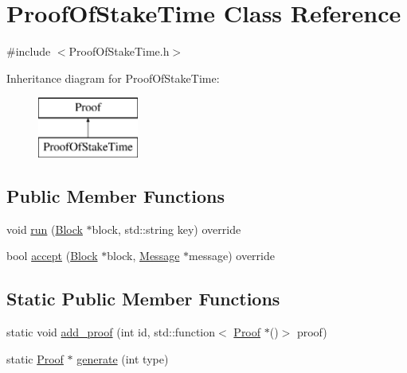 \hypertarget{classProofOfStakeTime}{}\section{Proof\+Of\+Stake\+Time Class Reference}
\label{classProofOfStakeTime}


{\ttfamily \#include $<$Proof\+Of\+Stake\+Time.\+h$>$}

Inheritance diagram for Proof\+Of\+Stake\+Time\+:\begin{figure}[H]
\begin{center}
\leavevmode
\includegraphics[height=2.000000cm]{classProofOfStakeTime}
\end{center}
\end{figure}
\subsection*{Public Member Functions}
\begin{DoxyCompactItemize}
\item 
void \mbox{\hyperlink{classProofOfStakeTime_ad4a49d7ccee740f307c03a13d314d3fb}{run}} (\mbox{\hyperlink{classBlock}{Block}} $\ast$block, std\+::string key) override
\item 
bool \mbox{\hyperlink{classProofOfStakeTime_a7a681ba9510b3b11cd2269a69e64a66c}{accept}} (\mbox{\hyperlink{classBlock}{Block}} $\ast$block, \mbox{\hyperlink{classMessage}{Message}} $\ast$message) override
\end{DoxyCompactItemize}
\subsection*{Static Public Member Functions}
\begin{DoxyCompactItemize}
\item 
static void \mbox{\hyperlink{classProof_a71874539fdbcc93c15594b889c95225b}{add\+\_\+proof}} (int id, std\+::function$<$ \mbox{\hyperlink{classProof}{Proof}} $\ast$()$>$ proof)
\item 
static \mbox{\hyperlink{classProof}{Proof}} $\ast$ \mbox{\hyperlink{classProof_a267f0f4587babb59884b5f280e2d54c8}{generate}} (int type)
\end{DoxyCompactItemize}
